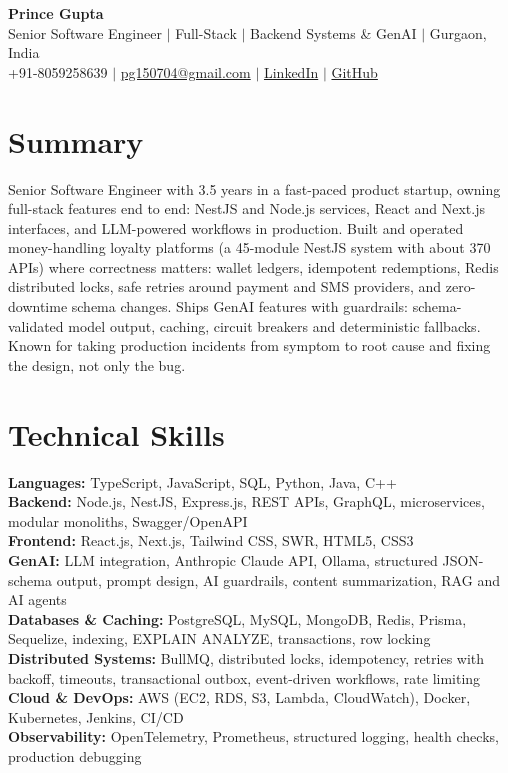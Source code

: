 \documentclass[letterpaper,10pt]{article}
\begin{document}
\begin{center}
{\Huge \textbf{Prince Gupta}}\\ \vspace{3pt}
\small Senior Software Engineer $|$ Full-Stack $|$ Backend Systems \& GenAI $|$ Gurgaon, India\\
\small +91-8059258639 $|$ \href{mailto:pg150704@gmail.com}{pg150704@gmail.com} $|$
\href{https://linkedin.com/in/princegupta123/}{LinkedIn} $|$
\href{https://github.com/princegupta-dev}{GitHub}
\end{center}

\section{Summary}
\small{Senior Software Engineer with 3.5 years in a fast-paced product startup, owning full-stack features end to end: NestJS and Node.js services, React and Next.js interfaces, and LLM-powered workflows in production. Built and operated money-handling loyalty platforms (a 45-module NestJS system with about 370 APIs) where correctness matters: wallet ledgers, idempotent redemptions, Redis distributed locks, safe retries around payment and SMS providers, and zero-downtime schema changes. Ships GenAI features with guardrails: schema-validated model output, caching, circuit breakers and deterministic fallbacks. Known for taking production incidents from symptom to root cause and fixing the design, not only the bug.}

\section{Technical Skills}
\begin{itemize}[leftmargin=.15in,label={}]
\small{\item{
\textbf{Languages:} TypeScript, JavaScript, SQL, Python, Java, C++\\
\textbf{Backend:} Node.js, NestJS, Express.js, REST APIs, GraphQL, microservices, modular monoliths, Swagger/OpenAPI\\
\textbf{Frontend:} React.js, Next.js, Tailwind CSS, SWR, HTML5, CSS3\\
\textbf{GenAI:} LLM integration, Anthropic Claude API, Ollama, structured JSON-schema output, prompt design, AI guardrails, content summarization, RAG and AI agents\\
\textbf{Databases \& Caching:} PostgreSQL, MySQL, MongoDB, Redis, Prisma, Sequelize, indexing, EXPLAIN ANALYZE, transactions, row locking\\
\textbf{Distributed Systems:} BullMQ, distributed locks, idempotency, retries with backoff, timeouts, transactional outbox, event-driven workflows, rate limiting\\
\textbf{Cloud \& DevOps:} AWS (EC2, RDS, S3, Lambda, CloudWatch), Docker, Kubernetes, Jenkins, CI/CD\\
\textbf{Observability:} OpenTelemetry, Prometheus, structured logging, health checks, production debugging
}}
\end{itemize}
\end{document}
